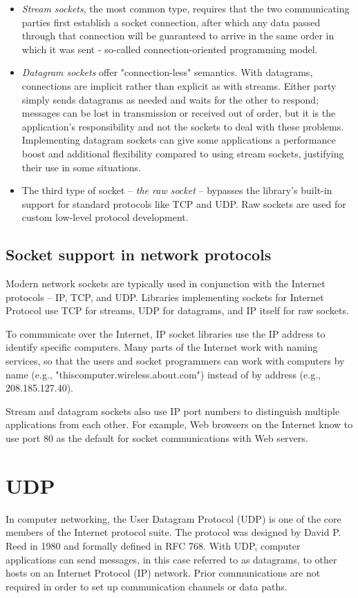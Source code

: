 \documentclass[a4paper,12pt]{article}
\begin{document}
\begin{itemize}
	\item \textit{Stream sockets}, the most common type, requires that the two communicating parties first establish a socket connection, after which any data passed through that connection will be guaranteed to arrive in the same order in which it was sent - so-called connection-oriented programming model.
	\item \textit{Datagram sockets} offer "connection-less" semantics. With datagrams, connections are implicit rather than explicit as with streams. Either party simply sends datagrams as needed and waits for the other to respond; messages can be lost in transmission or received out of order, but it is the application's responsibility and not the sockets to deal with these problems. Implementing datagram sockets can give some applications a performance boost and additional flexibility compared to using stream sockets, justifying their use in some situations.
	\item The third type of socket -- \textit{the raw socket} -- bypasses the library's built-in support for standard protocols like TCP and UDP. Raw sockets are used for custom low-level protocol development.
\end{itemize}
    
\subsection{Socket support in network protocols}
Modern network sockets are typically used in conjunction with the Internet protocols -- IP, TCP, and UDP. Libraries implementing sockets for Internet Protocol use TCP for streams, UDP for datagrams, and IP itself for raw sockets.
    
    
To communicate over the Internet, IP socket libraries use the IP address to identify specific computers. Many parts of the Internet work with naming services, so that the users and socket programmers can work with computers by name (e.g., "thiscomputer.wireless.about.com") instead of by address (e.g., 208.185.127.40).
    
    
Stream and datagram sockets also use IP port numbers to distinguish multiple applications from each other. For example, Web browsers on the Internet know to use port 80 as the default for socket communications with Web servers.
    
    
\section{UDP}
In computer networking, the User Datagram Protocol (UDP) is one of the core members of the Internet protocol suite. The protocol was designed by David P. Reed in 1980 and formally defined in RFC 768. With UDP, computer applications can send messages, in this case referred to as datagrams, to other hosts on an Internet Protocol (IP) network. Prior communications are not required in order to set up communication channels or data paths.
\end{document}
